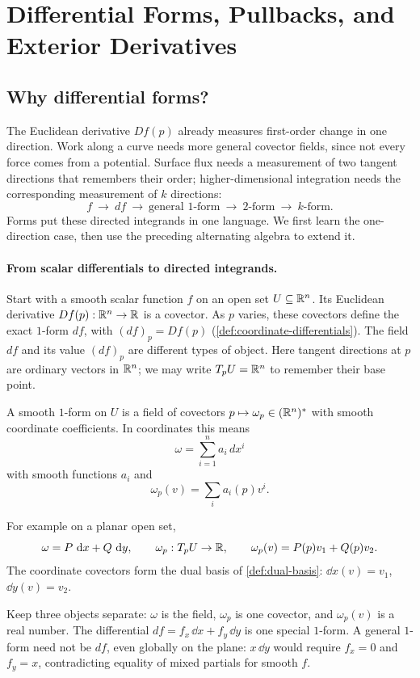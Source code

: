 \section{Differential Forms, Pullbacks, and Exterior Derivatives}
\label{sec:forms-pullbacks}

\subsection{Why differential forms?}
The Euclidean derivative $Df(p)$ already measures first-order change in one
direction. Work along a curve needs more general covector fields, since
not every force comes from a potential. Surface flux needs a measurement
of two tangent directions that remembers their order; higher-dimensional
integration needs the corresponding measurement of $k$ directions:
\[
f\ \longrightarrow\ df\ \longrightarrow\ \text{general $1$-form}
\ \longrightarrow\ \text{$2$-form}\ \longrightarrow\ \text{$k$-form}.
\]
Forms put these directed integrands in one language. We first learn the
one-direction case, then use the preceding alternating algebra to extend it.

\paragraph{From scalar differentials to directed integrands.}
Start with a smooth scalar function $f$ on an open set $U\subseteq\mathbb{R}^n$.
Its Euclidean derivative $Df(p):\mathbb{R}^n\to\mathbb{R}$ is a covector.
As $p$ varies, these covectors define the exact $1$-form $df$, with
$(df)_p=Df(p)$ (\cref{def:coordinate-differentials}). The field $df$ and
its value $(df)_p$ are different types of object. Here tangent directions at $p$ are ordinary
vectors in $\mathbb{R}^n$; we may write $T_pU=\mathbb{R}^n$ to remember their base point.

\begin{definition}\label{def:one-form-first}
A smooth $1$-form on $U$ is a field of covectors
$p\mapsto\omega_p\in(\mathbb{R}^n)^*$ with smooth coordinate coefficients.
In coordinates this means
\[
\omega=\sum_{i=1}^n a_i\,dx^i
\]
 with smooth
functions $a_i$ and
\[
\omega_p(v)=\sum_i a_i(p)v^i.
\]

For example on a planar open set,
\[
\omega=P\,\mathop{}\!\mathrm{d} x+Q\,\mathop{}\!\mathrm{d} y,\qquad
\omega_p:T_pU\to\mathbb{R},\qquad
\omega_p(v)=P(p)v_1+Q(p)v_2.
\]
The coordinate covectors form the dual basis of
\cref{def:dual-basis}: $\dd x(v)=v_1$, $\dd y(v)=v_2$.
\end{definition}
Keep three objects separate: $\omega$ is the field, $\omega_p$ is one
covector, and $\omega_p(v)$ is a real number. The differential
$df=f_x\,\dd x+f_y\,\dd y$ is one special $1$-form. A general $1$-form
need not be $df$, even globally on the plane: $x\,\dd y$ would require
$f_x=0$ and $f_y=x$, contradicting equality of mixed partials for smooth $f$.

